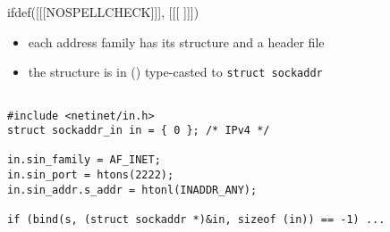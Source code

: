 
ifdef([[[NOSPELLCHECK]]], [[[
]]])

\begin{slide}

\begin{itemize}
\item each address family has its structure and a header file
\item the structure is in () type-casted to \texttt{struct sockaddr}
\end{itemize}

\begin{verbatim}

#include <netinet/in.h>
struct sockaddr_in in = { 0 }; /* IPv4 */

in.sin_family = AF_INET;
in.sin_port = htons(2222);
in.sin_addr.s_addr = htonl(INADDR_ANY);

if (bind(s, (struct sockaddr *)&in, sizeof (in)) == -1) ...
\end{verbatim}
\end{slide}

\label{BIND_EXAMPLE}

